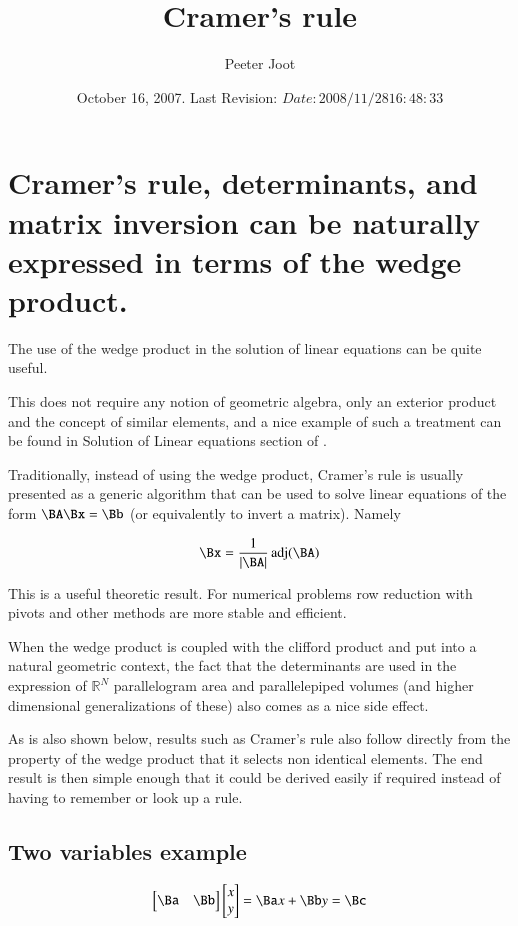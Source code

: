 \documentclass{article}      %
\title{Cramer's rule} %
\author{Peeter Joot}         %
\date{ October 16, 2007.  Last Revision: $Date: 2008/11/28 16:48:33 $ }
\begin{document}

\maketitle{}

\section{Cramer's rule, determinants, and matrix inversion can be naturally expressed in terms of the wedge product. }

The use of the wedge product in the solution of linear equations can be quite useful.

This does not require any notion of geometric algebra, only an exterior product and the concept of similar elements, and a nice example of such a treatment can be found in Solution of Linear equations section of \cite{grassmanbookExteriorProduct}.

Traditionally, instead of using the wedge product, Cramer's rule is usually presented as a generic algorithm that can be used to solve linear equations of the form $\BA \Bx = \Bb$ (or equivalently to invert a matrix).  Namely

\[
\Bx = \frac{1}{|\BA|}\operatorname{adj}(\BA)
\]

This is a useful theoretic result.  For numerical problems row reduction with pivots and other methods are more stable and efficient.

When the wedge product is coupled with the clifford product and put into a natural geometric context, the fact that the determinants are used in the expression of ${\mathbb R}^N$ parallelogram area and parallelepiped volumes (and higher dimensional generalizations of these) also comes as a nice side effect.

As is also shown below, results such as Cramer's rule also follow directly from the property of the wedge product that it selects non identical elements.  The end result is then simple enough that it could be derived easily if required instead of having to remember or look up a rule.

\subsection{Two variables example }

\[
\begin{bmatrix}
\Ba & \Bb
\end{bmatrix}
\begin{bmatrix}
x \\ y
\end{bmatrix}
= \Ba x + \Bb y = \Bc
\]
\end{document}
